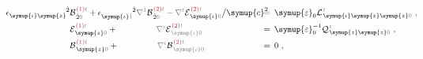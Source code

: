 \begin{subequations}
\begin{align}
	&\hspace{1.0em} \epsilon^{\hphantom{\symup{\symup{\iota}z}}\hat{2}}_{\symup{\iota} \symup{z}} {\mathcal{B}}^{\;\!\textcolor{Maroon}{(1)}\mathcolor{gray}{t}}_{\;\! \hat{2}\mathcolor{gray}{0}} + \epsilon^{\hphantom{\symup{\iota}\hat{1}}\hat{2}}_{\symup{\iota}\mathcolor{gray}{\hat{1}}} \mathcolor{gray}{\nabla^{\hat{1}}} 
	{\mathcal{B}}^{\;\!\textcolor{Maroon}{(2)}\mathcolor{gray}{t}}_{\;\! \hat{2}\mathcolor{gray}{0}} - \mathcolor{gray}{\nabla^t} 
	{\mathcal{E}}^{\;\!\textcolor{Maroon}{(2)}\mathcolor{gray}{t}}_{\;\! \symup{\iota}\mathcolor{gray}{0}} \big/ {\symup{c}}^2 \hspace{-1.8em}&&=\hspace{0.2em} {\symup{\varepsilon}}_0 {\mathcal{L}}^{\;\!\mathcolor{gray}{t}}_{\;\! \symup{\iota}\symup{z} \symup{z} \mathcolor{gray}{0}}~, \hspace{-2.5em} &&\hspace{-1.3em} \label{eq:curl-EB-01-delta'2} \\
	&\hspace{1.0em} \hphantom{\epsilon^{\hphantom{\symup{\symup{\iota}z}}\hat{2}}_{\symup{\iota} \symup{z}}} {\mathcal{E}}^{\;\!\textcolor{Maroon}{(1)}\mathcolor{gray}{t}}_{\;\! \symup{z} \mathcolor{gray}{0}} + \hphantom{\epsilon^{\hphantom{\symup{\iota}\hat{1}}\hat{2}}_{\symup{\iota}\mathcolor{gray}{\hat{1}}}} \mathcolor{gray}{\nabla^\iota} 
	{\mathcal{E}}^{\;\!\textcolor{Maroon}{(2)}\mathcolor{gray}{t}}_{\;\! \mathcolor{gray}{\symup{\iota}} \mathcolor{gray}{0}} \hspace{-1.8em}&&=\hspace{0.2em} {\symup{\varepsilon}}_0^{-1} {\mathcal{Q}}^{\;\!\mathcolor{gray}{t}}_{\;\! \symup{z} \symup{z} \mathcolor{gray}{0}}~, \hspace{-2.5em} &&\hspace{-1.3em} \label{eq:curl-EB-01-delta'3} \\ 
	&\hspace{1.0em} \hphantom{\epsilon^{\hphantom{\symup{\symup{\iota}z}}\hat{2}}_{\symup{\iota} \symup{z}}} {\mathcal{B}}^{\;\!\textcolor{Maroon}{(1)}\mathcolor{gray}{t}}_{\;\! \symup{z} \mathcolor{gray}{0}} + \hphantom{\epsilon^{\hphantom{\symup{\iota}\hat{1}}\hat{2}}_{\symup{\iota}\mathcolor{gray}{\hat{1}}}} \mathcolor{gray}{\nabla^\iota} 
	{\mathcal{B}}^{\;\!\textcolor{Maroon}{(2)}\mathcolor{gray}{t}}_{\;\! \mathcolor{gray}{\symup{\iota}} \mathcolor{gray}{0}} \hspace{-1.8em}&&=\hspace{0.2em} 0~, \hspace{-2.5em} &&\hspace{-1.3em} \label{eq:curl-EB-01-delta'4} \\[0.7em]

\end{align}
\end{subequations}
